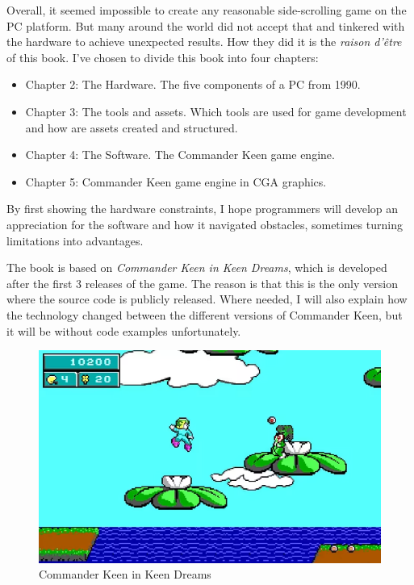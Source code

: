 \documentclass[book.tex]{subfiles}
\begin{document}
Overall, it seemed impossible to create any reasonable side-scrolling game on the PC platform. But many around the world did not accept that and tinkered with the hardware to achieve unexpected results. How they did it is the \textit{raison d'\^etre} of this book. I've chosen to divide this book into four chapters:
\begin{itemize}
  \item Chapter 2: The Hardware. The five components of a PC from 1990.
  \item Chapter 3: The tools and assets. Which tools are used for game development and how are assets created and structured.
  \item Chapter 4: The Software. The Commander Keen game engine.
  \item Chapter 5: Commander Keen game engine in CGA graphics.
\end{itemize}
By first showing the hardware constraints, I hope programmers will develop an appreciation for the software and how it navigated obstacles, sometimes turning limitations into advantages.\\
\par
The book is based on \textit{Commander Keen in Keen Dreams}, which is developed after the first 3 releases of the game. The reason is that this is the only version where the source code is publicly released. Where needed, I will also explain how the technology changed between the different versions of Commander Keen, but it will be without code examples unfortunately.\\
\begin{figure}[H]
  \centering
 \includegraphics[width=1.0\textwidth]{screenshots_300dpi/Keen_Dreams.png}
\caption{Commander Keen in Keen Dreams}
\end{figure}
\par
\end{document}
